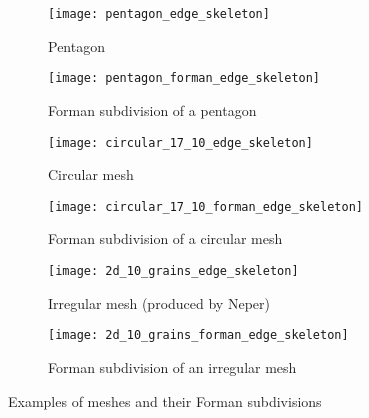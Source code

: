 \begin{figure}[!ht]
  \begin{subfigure}{.5\textwidth}
    \centering
    \texttt{[image: pentagon\_edge\_skeleton]}
    \caption{Pentagon}
  \end{subfigure} 
  \begin{subfigure}{.5\textwidth}
    \centering
    \texttt{[image: pentagon\_forman\_edge\_skeleton]}
    \caption{Forman subdivision of a pentagon}
  \end{subfigure}

  \begin{subfigure}{.5\textwidth}
    \centering
    \texttt{[image: circular\_17\_10\_edge\_skeleton]}
    \caption{Circular mesh}
  \end{subfigure} 
  \begin{subfigure}{.5\textwidth}
    \centering
    \texttt{[image: circular\_17\_10\_forman\_edge\_skeleton]}
    \caption{Forman subdivision of a circular mesh}
  \end{subfigure}
  
  \begin{subfigure}{.5\textwidth}
    \centering
    \texttt{[image: 2d\_10\_grains\_edge\_skeleton]}
    \caption{Irregular mesh (produced by Neper)}
  \end{subfigure} 
  \begin{subfigure}{.5\textwidth}
    \centering
    \texttt{[image: 2d\_10\_grains\_forman\_edge\_skeleton]}
    \caption{Forman subdivision of an irregular mesh}
  \end{subfigure}
  \caption{Examples of meshes and their Forman subdivisions}
  \label{figure:mesh/forman_subdivision_examples}
\end{figure}

